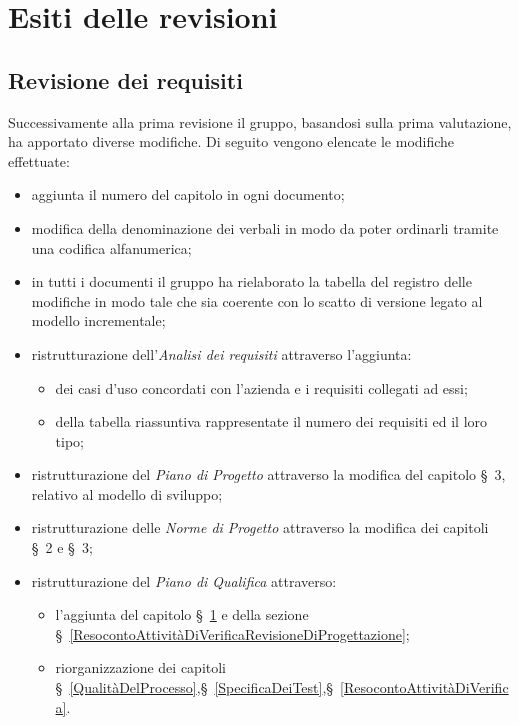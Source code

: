\chapter{Esiti delle revisioni}\label{EsitiDelleRevisioni}

\section{Revisione dei requisiti}\label{EsitiDelleRevisioniRevisioneDeiRequisiti}

Successivamente alla prima revisione il gruppo, basandosi sulla prima valutazione, ha apportato diverse modifiche. Di seguito vengono elencate le modifiche effettuate:
\begin{itemize}
	\item aggiunta il numero del capitolo in ogni documento;
	\item modifica della denominazione dei verbali in modo da poter ordinarli tramite una codifica alfanumerica; 
	\item in tutti i documenti il gruppo ha rielaborato la tabella del registro delle modifiche in modo tale che sia coerente con lo scatto di versione legato al modello incrementale;
	\item ristrutturazione dell'\textit{Analisi dei requisiti} attraverso l'aggiunta: 
	\begin{itemize}
		\item dei casi d'uso concordati con l'azienda e i requisiti collegati ad essi;
		\item della tabella riassuntiva rappresentate il numero dei requisiti ed il loro tipo;
	\end{itemize}
	\item ristrutturazione del \textit{Piano di Progetto} attraverso la modifica del capitolo \S~3, relativo al modello di sviluppo;
	\item ristrutturazione delle \textit{Norme di Progetto} attraverso la modifica dei capitoli \S~2 e \S~3;
	\item ristrutturazione del \textit{Piano di Qualifica} attraverso:
	\begin{itemize}
		\item l'aggiunta del capitolo \S~\ref{EsitiDelleRevisioni} e della sezione \S~\ref{ResocontoAttivitàDiVerificaRevisioneDiProgettazione};%
		\item riorganizzazione dei capitoli \S~\ref{QualitàDelProcesso},\S~\ref{SpecificaDeiTest},\S~\ref{ResocontoAttivitàDiVerifica}.
	\end{itemize}
\end{itemize}